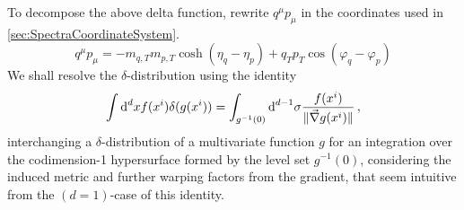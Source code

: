To decompose the above delta function, rewrite $q^\mu p_\mu$ in the coordinates used in \ref{sec:SpectraCoordinateSystem}.
\begin{equation}
    q^\mu p_\mu=-m_{q,T} m_{p,T}\cosh(\eta_q-\eta_p)+q_T p_T\cos(\varphi_q-\varphi_p)
\end{equation}
We shall resolve the $\delta$-distribution using the identity
\begin{equation}
    \int\text{d}^dx f(x^i)\delta(g(x^i))=\int_{g^{-1}(0)}\text{d}^{d-1}\sigma\frac{f(x^i)}{\Vert\vec{\nabla}g(x^i)\Vert}\,,
\end{equation}
interchanging a $\delta$-distribution of a multivariate function $g$ for an integration over the codimension-1 hypersurface formed by the level set ${g^{-1}(0)}$, considering the induced metric and further warping factors from the gradient, that seem intuitive from the ${(d=1)}$-case of this identity.

